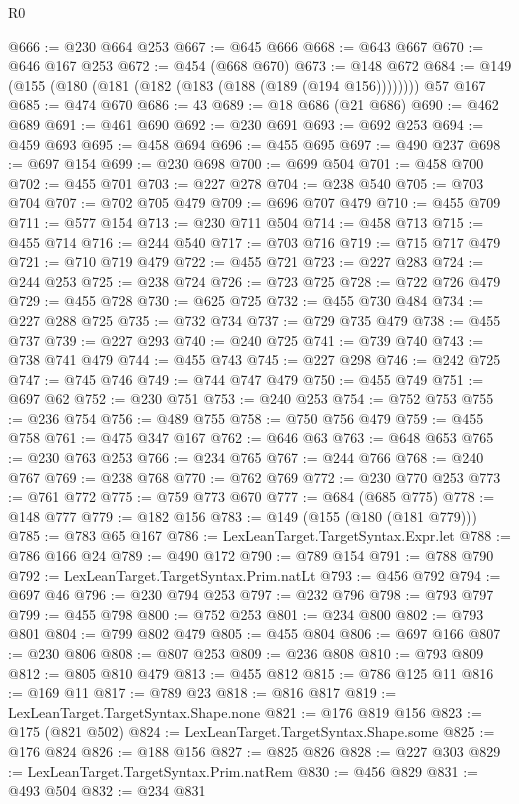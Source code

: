 \begin{lexlean}{R0}
\begin{coremodule}
@666 := @230 @664 @253
@667 := @645 @666
@668 := @643 @667
@670 := @646 @167 @253
@672 := @454 (@668 @670)
@673 := @148 @672
@684 := @149 (@155 (@180 (@181 (@182 (@183 (@188 (@189 (@194 @156)))))))) @57 @167
@685 := @474 @670
@686 := 43
@689 := @18 @686 (@21 @686)
@690 := @462 @689
@691 := @461 @690
@692 := @230 @691
@693 := @692 @253
@694 := @459 @693
@695 := @458 @694
@696 := @455 @695
@697 := @490 @237
@698 := @697 @154
@699 := @230 @698
@700 := @699 @504
@701 := @458 @700
@702 := @455 @701
@703 := @227 @278
@704 := @238 @540
@705 := @703 @704
@707 := @702 @705 @479
@709 := @696 @707 @479
@710 := @455 @709
@711 := @577 @154
@713 := @230 @711 @504
@714 := @458 @713
@715 := @455 @714
@716 := @244 @540
@717 := @703 @716
@719 := @715 @717 @479
@721 := @710 @719 @479
@722 := @455 @721
@723 := @227 @283
@724 := @244 @253
@725 := @238 @724
@726 := @723 @725
@728 := @722 @726 @479
@729 := @455 @728
@730 := @625 @725
@732 := @455 @730 @484
@734 := @227 @288 @725
@735 := @732 @734
@737 := @729 @735 @479
@738 := @455 @737
@739 := @227 @293
@740 := @240 @725
@741 := @739 @740
@743 := @738 @741 @479
@744 := @455 @743
@745 := @227 @298
@746 := @242 @725
@747 := @745 @746
@749 := @744 @747 @479
@750 := @455 @749
@751 := @697 @62
@752 := @230 @751
@753 := @240 @253
@754 := @752 @753
@755 := @236 @754
@756 := @489 @755
@758 := @750 @756 @479
@759 := @455 @758
@761 := @475 @347 @167
@762 := @646 @63
@763 := @648 @653
@765 := @230 @763 @253
@766 := @234 @765
@767 := @244 @766
@768 := @240 @767
@769 := @238 @768
@770 := @762 @769
@772 := @230 @770 @253
@773 := @761 @772
@775 := @759 @773 @670
@777 := @684 (@685 @775)
@778 := @148 @777
@779 := @182 @156
@783 := @149 (@155 (@180 (@181 @779)))
@785 := @783 @65 @167
@786 := LexLeanTarget.TargetSyntax.Expr.let
@788 := @786 @166 @24
@789 := @490 @172
@790 := @789 @154
@791 := @788 @790
@792 := LexLeanTarget.TargetSyntax.Prim.natLt
@793 := @456 @792
@794 := @697 @46
@796 := @230 @794 @253
@797 := @232 @796
@798 := @793 @797
@799 := @455 @798
@800 := @752 @253
@801 := @234 @800
@802 := @793 @801
@804 := @799 @802 @479
@805 := @455 @804
@806 := @697 @166
@807 := @230 @806
@808 := @807 @253
@809 := @236 @808
@810 := @793 @809
@812 := @805 @810 @479
@813 := @455 @812
@815 := @786 @125 @11
@816 := @169 @11
@817 := @789 @23
@818 := @816 @817
@819 := LexLeanTarget.TargetSyntax.Shape.none
@821 := @176 @819 @156
@823 := @175 (@821 @502)
@824 := LexLeanTarget.TargetSyntax.Shape.some
@825 := @176 @824
@826 := @188 @156
@827 := @825 @826
@828 := @227 @303
@829 := LexLeanTarget.TargetSyntax.Prim.natRem
@830 := @456 @829
@831 := @493 @504
@832 := @234 @831

\end{coremodule}
\end{lexlean}
